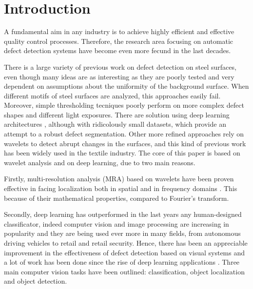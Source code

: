 \section{Introduction}
    \par{
        A fundamental aim in any industry is to achieve highly efficient and effective quality control processes. Therefore, the research area focusing on automatic defect detection systems have become even more fecund in the last decades. 
    }
    \par{
        There is a large variety of previous work on defect detection on steel surfaces, even though many ideas \cite{ieee:4777721, ieee:7030439, ieee:8623728} are as interesting as they are poorly tested and very dependent on assumptions about the uniformity of the background surface. When different motifs of steel surfaces are analyzed, this approaches easily fail. Moreover, simple thresholding tecniques poorly perform on more complex defect shapes and different light exposures. There are solution using deep learning architectures \cite{ieee:1334512, ieee:6738559}, although with ridicolously small datasets, which provide an attempt to a robust defect segmentation. Other more refined approaches rely on wavelets to detect abrupt changes in the surfaces, and this kind of previous work \cite{ieee:993164, ieee:6703333, ieee:7155940, sciencedirect:NGAN2011442} has been widely used in the textile industry. The core of this paper is based on wavelet analysis and on deep learning, due to two main reasons.
    }
    \par{
        Firstly, multi-resolution analysis (MRA) based on wavelets have been proven effective in facing localization both in spatial and in frequency domains \cite{Vetterli:1995:WSC:201007, Daubechies:1992:TLW:130655, intechopen:bernardini}. This because of their mathematical properties, compared to Fourier's transform.
    }
    \par{
        Secondly, deep learning \cite{Goodfellow:2016:DL:3086952, Rojas:1996:NNS:235222} has outperformed in the last years any human-designed classificator, indeed computer vision and image processing are increasing in popularity and they are being used ever more in many fields, from autonomous driving vehicles to retail and retail security. Hence, there has been an appreciable improvement in the effectiveness of defect detection based on visual systems and a lot of work has been done since the rise of deep learning applications \cite{researchgate:deeplearning}. Three main computer vision tasks have been outlined: classification, object localization and object detection.
    }
